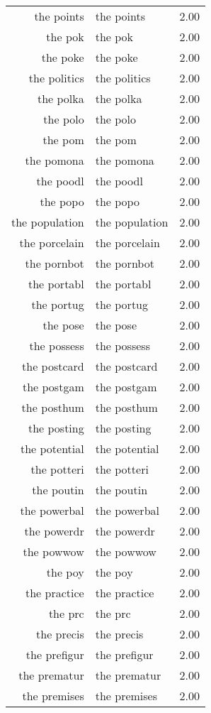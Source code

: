 \begin{table}[ht]
\begin{tabular}{rlr}
  the points & the points & 2.00 \\ 
  the pok & the pok & 2.00 \\ 
  the poke & the poke & 2.00 \\ 
  the politics & the politics & 2.00 \\ 
  the polka & the polka & 2.00 \\ 
  the polo & the polo & 2.00 \\ 
  the pom & the pom & 2.00 \\ 
  the pomona & the pomona & 2.00 \\ 
  the poodl & the poodl & 2.00 \\ 
  the popo & the popo & 2.00 \\ 
  the population & the population & 2.00 \\ 
  the porcelain & the porcelain & 2.00 \\ 
  the pornbot & the pornbot & 2.00 \\ 
  the portabl & the portabl & 2.00 \\ 
  the portug & the portug & 2.00 \\ 
  the pose & the pose & 2.00 \\ 
  the possess & the possess & 2.00 \\ 
  the postcard & the postcard & 2.00 \\ 
  the postgam & the postgam & 2.00 \\ 
  the posthum & the posthum & 2.00 \\ 
  the posting & the posting & 2.00 \\ 
  the potential & the potential & 2.00 \\ 
  the potteri & the potteri & 2.00 \\ 
  the poutin & the poutin & 2.00 \\ 
  the powerbal & the powerbal & 2.00 \\ 
  the powerdr & the powerdr & 2.00 \\ 
  the powwow & the powwow & 2.00 \\ 
  the poy & the poy & 2.00 \\ 
  the practice & the practice & 2.00 \\ 
  the prc & the prc & 2.00 \\ 
  the precis & the precis & 2.00 \\ 
  the prefigur & the prefigur & 2.00 \\ 
  the prematur & the prematur & 2.00 \\ 
  the premises & the premises & 2.00 \\ 

\end{tabular}
\end{table}
